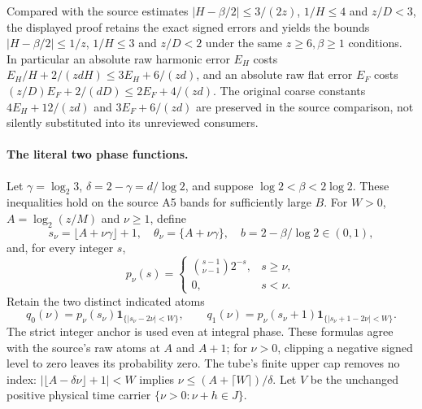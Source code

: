 \documentclass[11pt]{article}
\theoremstyle{remark}\newtheorem{remark}[proposition]{Remark}
\begin{document}
Compared with the source estimates
$|H-\beta/2|\le3/(2z)$, $1/H\le4$ and $z/D<3$,
the displayed proof retains the exact signed errors and yields the
bounds $|H-\beta/2|\le1/z$, $1/H\le3$ and $z/D<2$
under the same $z\ge6,\beta\ge1$ conditions.
In particular an absolute raw harmonic error $E_H$ costs
$E_H/H+2/(zdH)\le3E_H+6/(zd)$, and an absolute raw flat
error $E_F$ costs $(z/D)E_F+2/(dD)\le2E_F+4/(zd)$.
The original coarse constants $4E_H+12/(zd)$ and
$3E_F+6/(zd)$ are preserved in the source comparison, not silently
substituted into its unreviewed consumers.

\paragraph{The literal two phase functions.}
Let $\gamma=\log_2 3$, $\delta=2-\gamma=d/\log2$, and suppose
$\log2<\beta<2\log2$. These inequalities hold on the source A5
bands for sufficiently large $B$.
For $W>0$, $A=\log_2(z/M)$ and $\nu\ge1$, define
\[
 s_\nu=\lfloor A+\nu\gamma\rfloor+1,\quad
 \theta_\nu=\{A+\nu\gamma\},\quad
 b=2-\beta/\log2\in(0,1),
\]
and, for every integer $s$,
\[
 p_\nu(s)=
 \begin{cases}\binom{s-1}{\nu-1}2^{-s},&s\ge\nu,\\0,&s<\nu.\end{cases}
\]
Retain the two distinct indicated atoms
\[
 q_0(\nu)=p_\nu(s_\nu)\mathbf1_{\{|s_\nu-2\nu|<W\}},\qquad
 q_1(\nu)=p_\nu(s_\nu+1)\mathbf1_{\{|s_\nu+1-2\nu|<W\}}.
\]
The strict integer anchor is used even at integral phase.
These formulas agree with the source's raw atoms at $A$ and $A+1$;
for $\nu>0$, clipping a negative signed level to zero leaves its
probability zero. The tube's finite upper cap removes no index:
$|\lfloor A-\delta\nu\rfloor+1|<W$ implies
$\nu\le(A+\lceil W\rceil)/\delta$.
Let $V$ be the unchanged positive physical time carrier
$\{\nu>0:\nu+h\in J\}$.
\end{document}
